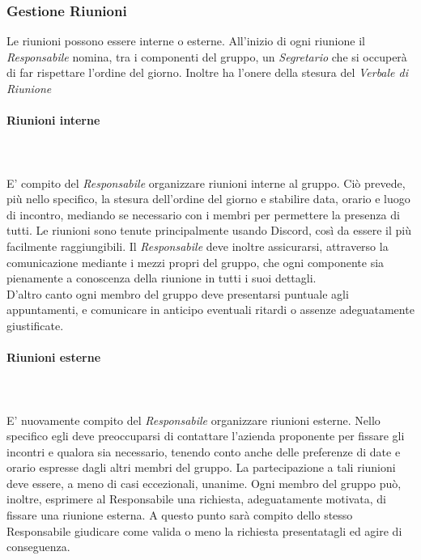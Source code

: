 \subsubsection{Gestione Riunioni}
Le riunioni possono essere interne o esterne. All'inizio di ogni riunione il \textit{Responsabile} nomina, tra i componenti del gruppo, un \textit{Segretario} che si occuperà di far rispettare l'ordine del giorno. Inoltre ha l'onere della stesura del \textit{Verbale di Riunione}\glo

\paragraph{Riunioni interne} \mbox{} \\ \mbox{} \\
E' compito del \textit{Responsabile} organizzare riunioni interne al gruppo. Ciò prevede, più nello specifico, la stesura dell'ordine del giorno e
stabilire data, orario e luogo di incontro, mediando se necessario con i membri per permettere la presenza di tutti. Le riunioni sono tenute principalmente usando Discord, così da essere il più facilmente raggiungibili.
Il \textit{Responsabile} deve inoltre assicurarsi, attraverso la comunicazione
mediante i mezzi propri del gruppo, che ogni componente sia pienamente a conoscenza della riunione in tutti i suoi dettagli. \\
D'altro canto ogni membro del gruppo deve presentarsi puntuale agli appuntamenti,
e comunicare in anticipo eventuali ritardi o assenze adeguatamente giustificate.

\paragraph{Riunioni esterne} \mbox{} \\ \mbox{} \\
E' nuovamente compito del \textit{Responsabile} organizzare riunioni esterne.
Nello specifico egli deve preoccuparsi di contattare l'azienda proponente per fissare gli
incontri e qualora sia necessario, tenendo conto anche delle preferenze di date e orario
espresse dagli altri membri del gruppo. La partecipazione a tali riunioni deve essere,
a meno di casi eccezionali, unanime.
Ogni membro del gruppo può, inoltre, esprimere al Responsabile una richiesta, adeguatamente motivata, di fissare una riunione esterna. A questo punto sarà compito
dello stesso Responsabile giudicare come valida o meno la richiesta presentatagli ed
agire di conseguenza.

